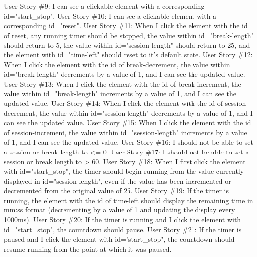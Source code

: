 \documentclass{article}%
\begin{document}
User Story \#9: I can see a clickable element with a corresponding id="start\_stop".\newline%
User Story \#10: I can see a clickable element with a corresponding id="reset".\newline%
User Story \#11: When I click the element with the id of reset, any running timer should be stopped, the value within id="break{-}length" should return to 5, the value within id="session{-}length" should return to 25, and the element with id="time{-}left" should reset to it's default state.\newline%
User Story \#12: When I click the element with the id of break{-}decrement, the value within id="break{-}length" decrements by a value of 1, and I can see the updated value.\newline%
User Story \#13: When I click the element with the id of break{-}increment, the value within id="break{-}length" increments by a value of 1, and I can see the updated value.\newline%
User Story \#14: When I click the element with the id of session{-}decrement, the value within id="session{-}length" decrements by a value of 1, and I can see the updated value.\newline%
User Story \#15: When I click the element with the id of session{-}increment, the value within id="session{-}length" increments by a value of 1, and I can see the updated value.\newline%
User Story \#16: I should not be able to set a session or break length to <= 0.\newline%
User Story \#17: I should not be able to set a session or break length to > 60.\newline%
User Story \#18: When I first click the element with id="start\_stop", the timer should begin running from the value currently displayed in id="session{-}length", even if the value has been incremented or decremented from the original value of 25.\newline%
User Story \#19: If the timer is running, the element with the id of time{-}left should display the remaining time in mm:ss format (decrementing by a value of 1 and updating the display every 1000ms).\newline%
User Story \#20: If the timer is running and I click the element with id="start\_stop", the countdown should pause.\newline%
User Story \#21: If the timer is paused and I click the element with id="start\_stop", the countdown should resume running from the point at which it was paused.\newline%
\end{document}
